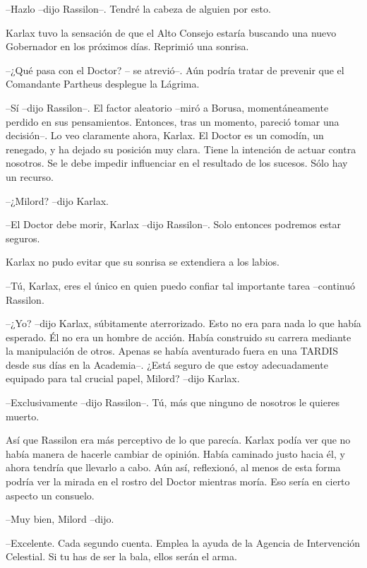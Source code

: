 --Hazlo --dijo Rassilon--. Tendré la cabeza de alguien por esto.



Karlax tuvo la sensación de que el Alto Consejo estaría buscando una nuevo Gobernador en los próximos días. Reprimió una sonrisa. 



--¿Qué pasa con el Doctor? -- se atrevió--. Aún podría tratar de prevenir que el Comandante Partheus desplegue la Lágrima.

--Sí --dijo Rassilon--. El factor aleatorio --miró a Borusa, momentáneamente perdido en sus pensamientos. Entonces, tras un momento, pareció tomar una decisión--. Lo veo claramente ahora, Karlax. El Doctor es un comodín, un renegado, y ha dejado su posición muy clara. Tiene la intención de actuar contra nosotros. Se le debe impedir influenciar en el resultado de los sucesos. Sólo hay un recurso.

--¿Milord? --dijo Karlax.

--El Doctor debe morir, Karlax --dijo Rassilon--. Solo entonces podremos estar seguros.



Karlax no pudo evitar que su sonrisa se extendiera a los labios.



--Tú, Karlax, eres el único en quien puedo confiar tal importante tarea --continuó Rassilon.

--¿Yo? --dijo Karlax, súbitamente aterrorizado. Esto no era para nada lo que había esperado. Él no era un hombre de acción. Había construido su carrera mediante la manipulación de otros. Apenas se había aventurado fuera en una TARDIS desde sus días en la Academia--. ¿Está seguro de que estoy adecuadamente equipado para tal crucial papel, Milord? --dijo Karlax.

--Exclusivamente --dijo Rassilon--. Tú, más que ninguno de nosotros le quieres muerto.



Así que Rassilon era más perceptivo de lo que parecía. Karlax podía ver que no había manera de hacerle cambiar de opinión. Había caminado justo hacia él, y ahora tendría que llevarlo a cabo. Aún así, reflexionó, al menos de esta forma podría ver la mirada en el rostro del Doctor mientras moría. Eso sería en cierto aspecto un consuelo.



--Muy bien, Milord --dijo.

--Excelente. Cada segundo cuenta. Emplea la ayuda de la Agencia de Intervención Celestial. Si tu has de ser la bala, ellos serán el arma.

